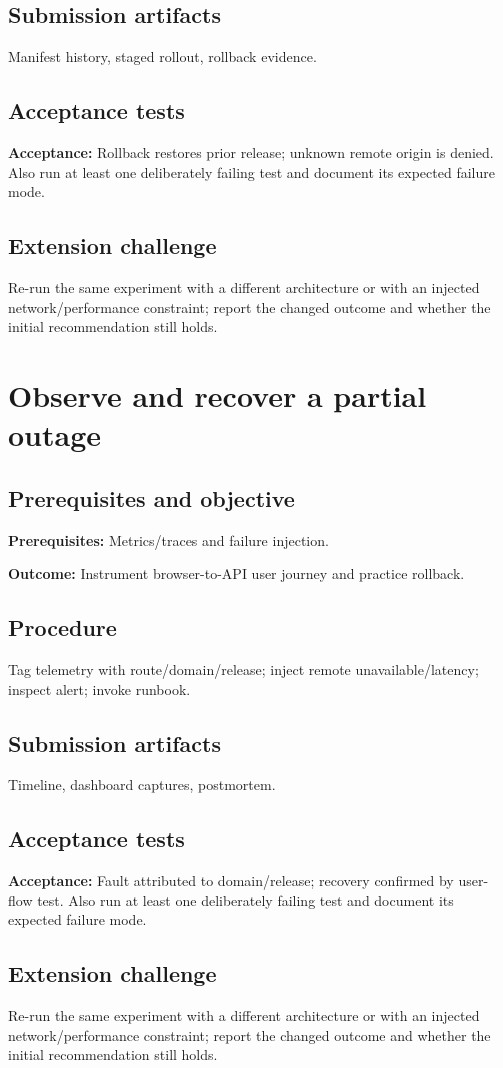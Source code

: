\documentclass[11pt,letterpaper,oneside]{report}
\newcommand{\criterion}[1]{\textbf{Acceptance:} #1}
\begin{document}
\section{Submission artifacts}
Manifest history, staged rollout, rollback evidence.
\section{Acceptance tests}
\criterion{Rollback restores prior release; unknown remote origin is denied.} Also run at least one deliberately failing test and document its expected failure mode.
\section{Extension challenge}
Re-run the same experiment with a different architecture or with an injected network/performance constraint; report the changed outcome and whether the initial recommendation still holds.

\chapter{Observe and recover a partial outage}
\section{Prerequisites and objective}
\textbf{Prerequisites:} Metrics/traces and failure injection.\par
\textbf{Outcome:} Instrument browser-to-API user journey and practice rollback.
\section{Procedure}
Tag telemetry with route/domain/release; inject remote unavailable/latency; inspect alert; invoke runbook.
\section{Submission artifacts}
Timeline, dashboard captures, postmortem.
\section{Acceptance tests}
\criterion{Fault attributed to domain/release; recovery confirmed by user-flow test.} Also run at least one deliberately failing test and document its expected failure mode.
\section{Extension challenge}
Re-run the same experiment with a different architecture or with an injected network/performance constraint; report the changed outcome and whether the initial recommendation still holds.
\end{document}
